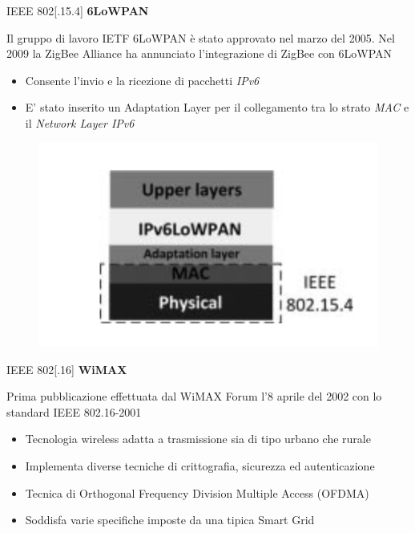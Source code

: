 \begin{frame}{IEEE 802[.15.4]}
	\textbf{6LoWPAN}
	\begin{block}{}
		Il gruppo di lavoro IETF 6LoWPAN è stato approvato nel marzo del 2005. Nel 2009 la ZigBee Alliance ha annunciato l'integrazione di ZigBee con 6LoWPAN
	\end{block}
	\begin{itemize}
		\item Consente l'invio e la ricezione di pacchetti \textit{IPv6}
		\item E' stato inserito un Adaptation Layer per il collegamento tra lo strato \textit{MAC} e il \textit{Network Layer IPv6}
	\end{itemize}
	\begin{figure}[h]
		\includegraphics[scale=0.3,cfbox=blue_slides 1pt 0pt]{imgs/6pan.png}
	\end{figure}
\end{frame}

\begin{frame}{IEEE 802[.16]}
	\textbf{WiMAX}
	\begin{block}{}
		Prima pubblicazione effettuata dal WiMAX Forum l'8 aprile del 2002 con lo standard IEEE 802.16-2001
	\end{block}
	\pause
	\begin{itemize}[<+- | alert@+>]
		\item Tecnologia wireless adatta a trasmissione sia di tipo urbano che rurale
		\item Implementa diverse tecniche di crittografia, sicurezza ed autenticazione
		\item Tecnica di Orthogonal Frequency Division Multiple Access (OFDMA)
		\item Soddisfa varie specifiche imposte da una tipica Smart Grid
	\end{itemize}
\end{frame}

